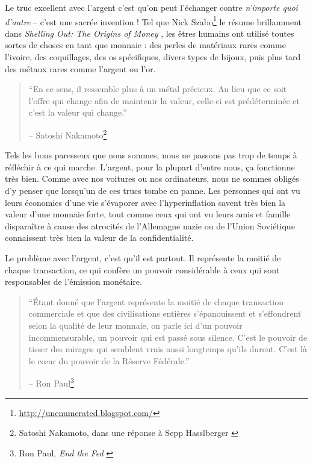 Le truc excellent avec l'argent c'est qu'on peut l'échanger contre
\textit{n'importe quoi d'autre} -- c'est une sacrée invention ! Tel que Nick
Szabo\footnote{\url{http://unenumerated.blogspot.com/}} le résume
brillamment dans \textit{Shelling Out: The Origins of Money}
\cite{shelling-out}, les êtres humains ont utilisé toutes sortes de choses en
tant que monnaie : des perles de matériaux rares comme l'ivoire, des
coquillages, des os spécifiques, divers types de bijoux, puis plus tard des
métaux rares comme l'argent ou l'or.

\begin{quotation}\begin{samepage}
\enquote{En ce sens, il ressemble plus à un métal précieux. Au lieu que
ce soit l'offre qui change afin de maintenir la valeur, celle-ci est
prédéterminée et c'est la valeur qui change.}
\begin{flushright} -- Satoshi Nakamoto\footnote{Satoshi Nakamoto, dans une
réponse à Sepp Hasslberger \cite{satoshi-precious-metal}}
\end{flushright}\end{samepage}\end{quotation}

Tels les bons paresseux que nous sommes, nous ne passons pas trop de temps à
réfléchir à ce qui marche. L'argent, pour la plupart d'entre nous, ça fonctionne
très bien. Comme avec nos voitures ou nos ordinateurs, nous ne sommes obligés
d'y penser que lorsqu'un de ces trucs tombe en panne. Les personnes qui ont vu
leurs économies d'une vie s'évaporer avec l'hyperinflation savent très bien la
valeur d'une monnaie forte, tout comme ceux qui ont vu leurs amis et famille
disparaître à cause des atrocités de l'Allemagne nazie ou de l'Union Soviétique
connaissent très bien la valeur de la confidentialité.

Le problème avec l'argent, c'est qu'il est partout. Il représente la moitié de
chaque transaction, ce qui confère un pouvoir considérable à ceux qui sont
responsables de l'émission monétaire.

\begin{quotation}\begin{samepage}
\enquote{Étant donné que l'argent représente la moitié de chaque transaction
commerciale et que des civilisations entières s'épanouissent et s'effondrent
selon la qualité de leur monnaie, on parle ici d'un pouvoir incommensurable, un
pouvoir qui est passé sous silence. C'est le pouvoir de tisser des mirages qui
semblent vrais aussi longtemps qu'ils durent. C'est là le cœur du pouvoir de la
Réserve Fédérale.}
\begin{flushright} -- Ron Paul\footnote{Ron Paul, \textit{End the Fed}
\cite{end-the-fed}}
\end{flushright}\end{samepage}\end{quotation}

